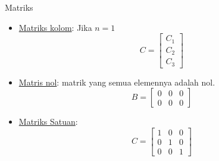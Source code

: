 \documentclass{beamer}
\begin{document}
\begin{frame}[t,fragile]{Matriks}
\begin{itemize}
\item \underline{Matriks kolom}: Jika $n=1$ \\
$$ C = \begin{bmatrix}
       	C_1 \\
	    C_2 \\
	    C_3 
        \end{bmatrix} $$
\item \underline{Matris nol}: matrik yang semua elemennya adalah nol.\\
$$ B = \begin{bmatrix}
       	0 & 0 & 0\\
	    0 & 0 & 0 
        \end{bmatrix} $$
\item \underline{Matriks Satuan}:\\
$$ C = \begin{bmatrix}
       	1 & 0 & 0 \\
	    0 & 1 & 0 \\
	    0 & 0 & 1
        \end{bmatrix} $$
\end{itemize}
\end{frame}
\end{document}
